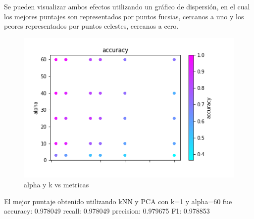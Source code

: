  
Se pueden visualizar ambos efectos utilizando un gráfico de dispersión, en el cual los mejores puntajes son representados por puntos fucsias, cercanos a uno y los peores representados por puntos celestes, cercanos a cero.
\begin{figure}[H]
    \begin{center}
      \includegraphics[width=0.6\columnwidth]{imagenes/charuli-des/k_and_alpha_vs_accuracy.png}
      \caption{alpha y k vs metricas}
    \end{center}
\end{figure}
 
 
El mejor puntaje obtenido utilizando kNN y PCA con k=1 y alpha=60 fue accuracy: 0.978049  recall: 0.978049  precision: 0.979675  F1: 0.978853
